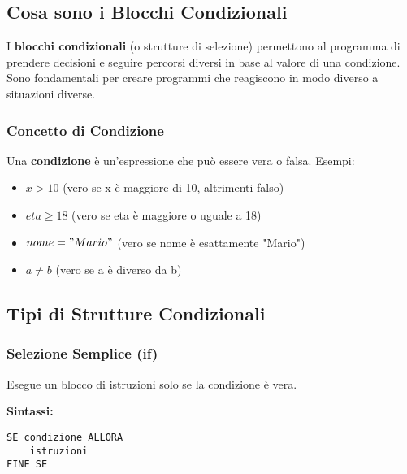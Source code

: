 \documentclass[a4paper,16pt]{article}
\begin{document}
\subsection{Cosa sono i Blocchi Condizionali}

I \textbf{blocchi condizionali} (o strutture di selezione) permettono al programma di prendere decisioni e seguire percorsi diversi in base al valore di una condizione. Sono fondamentali per creare programmi che reagiscono in modo diverso a situazioni diverse.

\subsubsection{Concetto di Condizione}

Una \textbf{condizione} è un'espressione che può essere vera o falsa. Esempi:
\begin{itemize}[leftmargin=*]
    \item $x > 10$ (vero se x è maggiore di 10, altrimenti falso)
    \item $eta \geq 18$ (vero se eta è maggiore o uguale a 18)
    \item $nome = "Mario"$ (vero se nome è esattamente "Mario")
    \item $a \neq b$ (vero se a è diverso da b)
\end{itemize}

\subsection{Tipi di Strutture Condizionali}

\subsubsection{Selezione Semplice (if)}

Esegue un blocco di istruzioni solo se la condizione è vera.

\textbf{Sintassi:}
\begin{lstlisting}
SE condizione ALLORA
    istruzioni
FINE SE
\end{lstlisting}

\begin{center}
\end{center}
\end{document}
